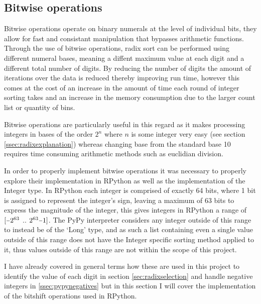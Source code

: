 \documentclass[12pt]{article}
\newcommand{\minus}{\scalebox{0.75}[1.0]{$-$}}
\begin{document}
\subsection{Bitwise operations}
\label{ssec:bitwise}
Bitwise operations operate on binary numerals at the level of individual bits, they allow for fast and consistant manipulation that bypasses arithmetic functions. Through the use of bitwise operations, radix sort can be performed using different numeral bases, meaning a diffent maximum value at each digit and a different total number of digits. By reducing the number of digits the amount of iterations over the data is reduced thereby improving run time, however this comes at the cost of an increase in the amount of time each round of integer sorting takes and an increase in the memory consumption due to the larger count list or quantity of bins. 
\par
Bitwise operations are particularly useful in this regard as it makes processing integers in bases of the order $2^n$ where $n$ is some integer very easy (see section \ref{ssec:radixexplanation}) whereas changing base from the standard base 10 requires time consuming arithmetic methods such as euclidian division.
\par
In order to properly implement bitwise operations it was necessary to properly explore their implementation in RPython as well as the implementation of the Integer type. In RPython each integer is comprised of exactly 64 bits, where 1 bit is assigned to represent the integer's sign, leaving a maximum of 63 bits to express the magnitude of the integer, this gives integers in RPython a range of $[\minus2^{63}$ $..$ $2^{63}\minus1]$. The PyPy interpreter considers any integer outside of this range to instead be of the `Long' type, and as such a list containing even a single value outside of this range does not have the Integer specific sorting method applied to it, thus values outside of this range are not within the scope of this project.
\par
I have already covered in general terms how these  are used in this project to identify the value of each digit in section \ref{sec:radixselection} and handle negative integers in \ref{ssec:pypynegatives} but in this section I will cover the implementation of the bitshift operations used in RPython.
\end{document}
